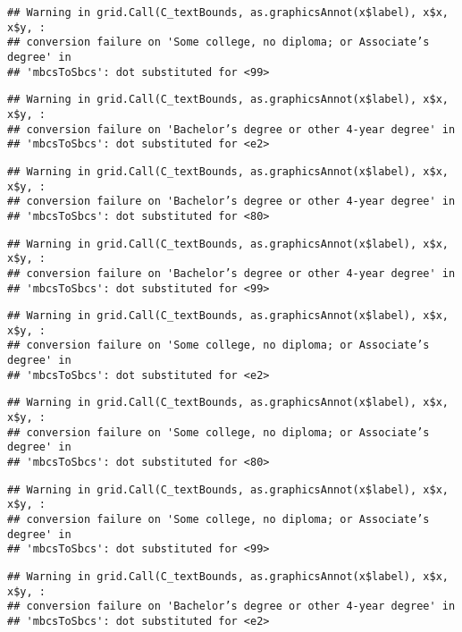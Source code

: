 \documentclass[
]{article}
\begin{document}
\begin{verbatim}
## Warning in grid.Call(C_textBounds, as.graphicsAnnot(x$label), x$x, x$y, :
## conversion failure on 'Some college, no diploma; or Associate’s degree' in
## 'mbcsToSbcs': dot substituted for <99>
\end{verbatim}

\begin{verbatim}
## Warning in grid.Call(C_textBounds, as.graphicsAnnot(x$label), x$x, x$y, :
## conversion failure on 'Bachelor’s degree or other 4-year degree' in
## 'mbcsToSbcs': dot substituted for <e2>
\end{verbatim}

\begin{verbatim}
## Warning in grid.Call(C_textBounds, as.graphicsAnnot(x$label), x$x, x$y, :
## conversion failure on 'Bachelor’s degree or other 4-year degree' in
## 'mbcsToSbcs': dot substituted for <80>
\end{verbatim}

\begin{verbatim}
## Warning in grid.Call(C_textBounds, as.graphicsAnnot(x$label), x$x, x$y, :
## conversion failure on 'Bachelor’s degree or other 4-year degree' in
## 'mbcsToSbcs': dot substituted for <99>
\end{verbatim}

\begin{verbatim}
## Warning in grid.Call(C_textBounds, as.graphicsAnnot(x$label), x$x, x$y, :
## conversion failure on 'Some college, no diploma; or Associate’s degree' in
## 'mbcsToSbcs': dot substituted for <e2>
\end{verbatim}

\begin{verbatim}
## Warning in grid.Call(C_textBounds, as.graphicsAnnot(x$label), x$x, x$y, :
## conversion failure on 'Some college, no diploma; or Associate’s degree' in
## 'mbcsToSbcs': dot substituted for <80>
\end{verbatim}

\begin{verbatim}
## Warning in grid.Call(C_textBounds, as.graphicsAnnot(x$label), x$x, x$y, :
## conversion failure on 'Some college, no diploma; or Associate’s degree' in
## 'mbcsToSbcs': dot substituted for <99>
\end{verbatim}

\begin{verbatim}
## Warning in grid.Call(C_textBounds, as.graphicsAnnot(x$label), x$x, x$y, :
## conversion failure on 'Bachelor’s degree or other 4-year degree' in
## 'mbcsToSbcs': dot substituted for <e2>
\end{verbatim}
\end{document}
